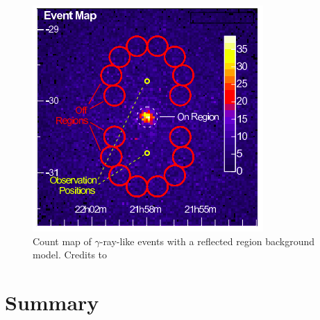  \begin{figure}[t]
\centering
\includegraphics[width=0.7\linewidth]{figures/introduction/reflected.png}
\caption{Count map of $\gamma$-ray-like events with a reflected region background model. Credits to \cite{berger_2014}}
\label{fig:reflected}
\end{figure}
\section{Summary}
\label{s:introduction-summary}

